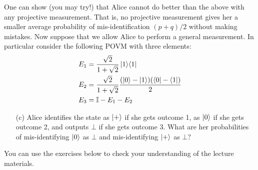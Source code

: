 \documentclass[12pt]{article}
\begin{document}
\begin{enumerate}
\begin{enumerate}
%
\end{enumerate}
One can show (you may try!) that Alice cannot do better than the above with any projective measurement. That is, no projective measurement gives her a smaller average probability of mis-identification $(p+q)/2$ without making mistakes. Now suppose that we allow Alice to perform a general measurement. In particular consider the following POVM with three elements:
\begin{align*}
E_1 &= \frac{\sqrt{2}}{1+\sqrt{2}} \ket{1}\!\bra{1} \\
E_2 &= \frac{\sqrt{2}}{1+\sqrt{2}} \frac{(\ket{0}-\ket{1})(\bra{0}-\bra{1})}{2} \\
E_3 &= \mathbb{I} - E_1 - E_2
\end{align*}
\begin{enumerate}
\item[(c)] Alice identifies the state as $\ket{+}$ if she gets outcome 1, as $\ket{0}$ if she gets outcome 2, and outputs $\bot$ if she gets outcome 3. What are her probabilities of mis-identifying $\ket{0}$ as $\bot$ and mis-identifying $\ket{+}$ as $\bot$?
%
\end{enumerate}
\end{enumerate}

\newpage
You can use the exercises below to check your understanding of the lecture materials.
\end{document}
